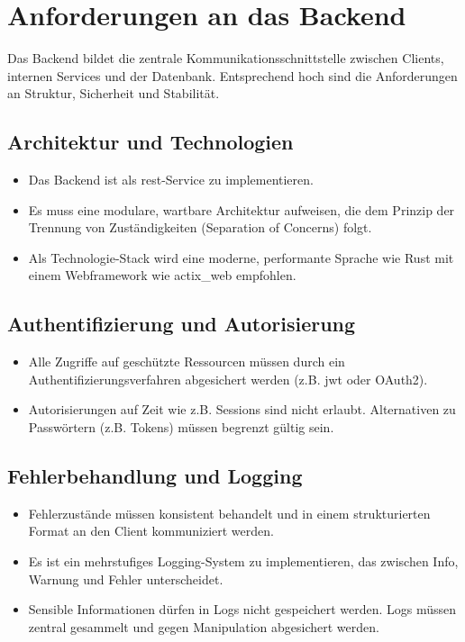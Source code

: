 \section{Anforderungen an das Backend}
Das Backend bildet die zentrale Kommunikationsschnittstelle zwischen Clients, internen Services und der Datenbank. Entsprechend hoch sind die Anforderungen an Struktur, Sicherheit und Stabilität.

\subsection{Architektur und Technologien}
\begin{itemize}
    \item Das Backend ist als \ac{rest}-Service zu implementieren.
    \item Es muss eine modulare, wartbare Architektur aufweisen, die dem Prinzip der Trennung von Zuständigkeiten (Separation of Concerns) folgt.
    \item Als Technologie-Stack wird eine moderne, performante Sprache wie Rust mit einem Webframework wie actix\_web empfohlen.
\end{itemize}

\subsection{Authentifizierung und Autorisierung}
\begin{itemize}
    \item Alle Zugriffe auf geschützte Ressourcen müssen durch ein Authentifizierungsverfahren abgesichert werden (z.B. \ac{jwt} oder OAuth2).
    \item Autorisierungen auf Zeit wie z.B. Sessions sind nicht erlaubt. Alternativen zu Passwörtern (z.B. Tokens) müssen begrenzt gültig sein.
\end{itemize}

\subsection{Fehlerbehandlung und Logging}
\begin{itemize}
    \item Fehlerzustände müssen konsistent behandelt und in einem strukturierten Format an den Client kommuniziert werden.
    \item Es ist ein mehrstufiges Logging-System zu implementieren, das zwischen Info, Warnung und Fehler unterscheidet.
    \item Sensible Informationen dürfen in Logs nicht gespeichert werden. Logs müssen zentral gesammelt und gegen Manipulation abgesichert werden.
\end{itemize}

